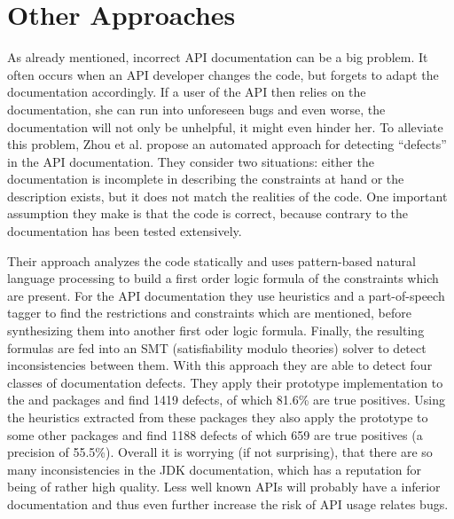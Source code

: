 
\section{Other Approaches}

As already mentioned, incorrect API documentation can be a big problem.
It often occurs when an API developer changes the code, but forgets to adapt the documentation accordingly.
If a user of the API then relies on the documentation, she can run into unforeseen bugs and even worse, the documentation will not only be unhelpful, it might even hinder her.
To alleviate this problem, Zhou et al.  \cite{zhou2017analyzing} propose an automated approach for detecting ``defects'' in the API documentation.
They consider two situations: either the documentation is incomplete in describing the constraints at hand or the description exists, but it does not match the realities of the code.
One important assumption they make is that the code is correct, because contrary to the documentation has been tested extensively.

Their approach analyzes the code statically and uses pattern-based natural language processing to build a first order logic formula of the constraints which are present.
For the API documentation they use heuristics and a part-of-speech tagger to find the restrictions and constraints which are mentioned, before synthesizing them into another first oder logic formula.
Finally, the resulting formulas are fed into an SMT (satisfiability modulo theories) solver \cite{barrett2009satisfiability} to detect inconsistencies between them.
With this approach they are able to detect four classes of documentation defects.
They apply their prototype implementation to the  and  packages and find 1419 defects, of which 81.6\% are true positives.
Using the heuristics extracted from these packages they also apply the prototype to some other packages and find 1188 defects of which 659 are true positives (a precision of 55.5\%).
Overall it is worrying (if not surprising), that there are so many inconsistencies in the JDK documentation, which has a reputation for being of rather high quality.
Less well known APIs will probably have a inferior documentation and thus even further increase the risk of API usage relates bugs.


